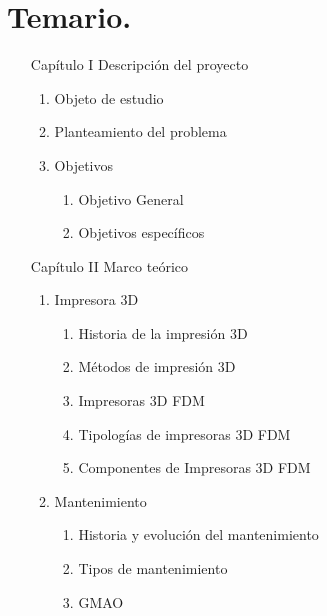 \documentclass[12pt,article]{article}
\begin{document}
\renewcommand{\theenumi}{\Roman{enumi}} %

\section{Temario.}
\begin{enumerate}

	\item[Capítulo I]  Descripción del proyecto
		\begin{enumerate}[label=1.\arabic*.] 
			\item Objeto de estudio
			\item Planteamiento del problema
			\item Objetivos
				\begin{enumerate}[label=1.3.\arabic*]
					\item Objetivo General
					\item Objetivos específicos 
				\end{enumerate}		
		\end{enumerate}
	\item[Capítulo II] Marco teórico
		\begin{enumerate}[label=2.\arabic*]
			\item Impresora 3D
				\begin{enumerate}[label=2.1.\arabic*]
					\item Historia de la impresión 3D	
					\item Métodos de impresión 3D
					\item Impresoras 3D FDM
					\item Tipologías de impresoras 3D FDM 
					\item Componentes de Impresoras 3D FDM	
				\end{enumerate}
			\item Mantenimiento
				\begin{enumerate}[label=2.2.\arabic*]
					\item Historia y evolución del mantenimiento
					\item Tipos de mantenimiento
					\item GMAO 
					

\end{enumerate}
\end{enumerate}
\end{enumerate}
\end{document}
